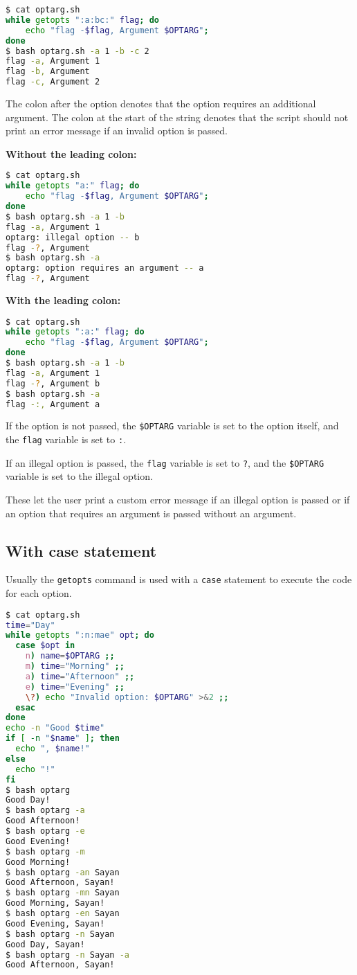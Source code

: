 \begin{lstlisting}[language=bash]
$ cat optarg.sh
while getopts ":a:bc:" flag; do
    echo "flag -$flag, Argument $OPTARG";
done
$ bash optarg.sh -a 1 -b -c 2
flag -a, Argument 1
flag -b, Argument
flag -c, Argument 2
\end{lstlisting}

The colon after the option denotes that the option requires an additional argument.
The colon at the start of the string denotes that the script should not print an error message if an invalid option is passed.

\textbf{Without the leading colon:}
\begin{lstlisting}[language=bash]
$ cat optarg.sh
while getopts "a:" flag; do
    echo "flag -$flag, Argument $OPTARG";
done
$ bash optarg.sh -a 1 -b
flag -a, Argument 1
optarg: illegal option -- b
flag -?, Argument
$ bash optarg.sh -a
optarg: option requires an argument -- a
flag -?, Argument
\end{lstlisting}

\textbf{With the leading colon:}
\begin{lstlisting}[language=bash]
$ cat optarg.sh
while getopts ":a:" flag; do
    echo "flag -$flag, Argument $OPTARG";
done
$ bash optarg.sh -a 1 -b
flag -a, Argument 1
flag -?, Argument b
$ bash optarg.sh -a
flag -:, Argument a
\end{lstlisting}

If the option is not passed, the \lstinline|$OPTARG| variable is set to the option itself, and the \lstinline|flag| variable is set to \lstinline|:|.

If an illegal option is passed, the \lstinline|flag| variable is set to \lstinline|?|, and the \lstinline|$OPTARG| variable is set to the illegal option.

These let the user print a custom error message if an illegal option is passed or if an option that requires an argument is passed without an argument.

\subsection{With case statement}

Usually the \lstinline|getopts| command is used with a \lstinline|case| statement to execute the code for each option.

\begin{lstlisting}[language=bash]
$ cat optarg.sh
time="Day"
while getopts ":n:mae" opt; do
  case $opt in
    n) name=$OPTARG ;;
    m) time="Morning" ;;
    a) time="Afternoon" ;;
    e) time="Evening" ;;
    \?) echo "Invalid option: $OPTARG" >&2 ;;
  esac
done
echo -n "Good $time"
if [ -n "$name" ]; then
  echo ", $name!"
else
  echo "!"
fi
$ bash optarg
Good Day!
$ bash optarg -a
Good Afternoon!
$ bash optarg -e
Good Evening!
$ bash optarg -m
Good Morning!
$ bash optarg -an Sayan
Good Afternoon, Sayan!
$ bash optarg -mn Sayan
Good Morning, Sayan!
$ bash optarg -en Sayan
Good Evening, Sayan!
$ bash optarg -n Sayan
Good Day, Sayan!
$ bash optarg -n Sayan -a
Good Afternoon, Sayan!
\end{lstlisting}


